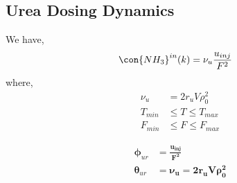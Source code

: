\subsection{Urea Dosing Dynamics}
We have,
\begin{align}
    \con{NH_3}^{in}(k) &= \nu_u \frac{u_{inj}}{F^2}   \label{eqn::urea_parm}
\end{align}
where,
\begin{align*}
    \nu_u &= 2r_u V \rho^2_0\\
    T_{min} &\leq T \leq T_{max}\\
    F_{min} &\leq F \leq F_{max}
\end{align*}

\begin{align*}
        \pmb \phi_{ur} &= \bm{\frac{u_{inj}}{F^2}}\\
        \pmb \theta_{ur} &= \bm{\nu_u = 2r_u V \rho^2_0}
\end{align*}

